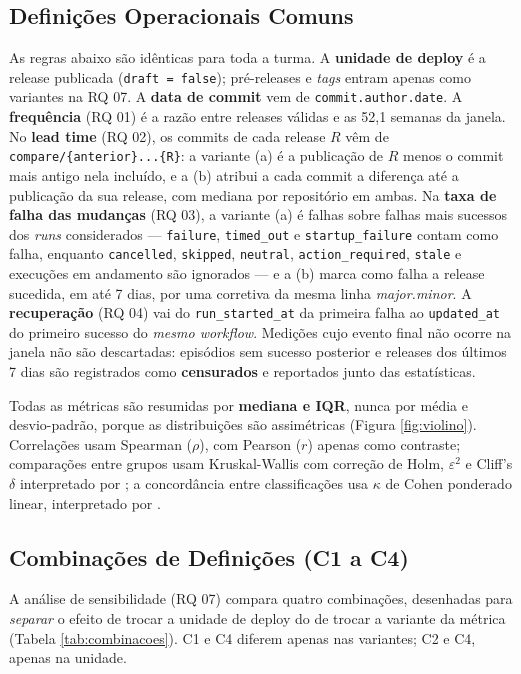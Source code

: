 \documentclass[12pt]{article}
\begin{document}
\subsection{Definições Operacionais Comuns}

As regras abaixo são idênticas para toda a turma. A \textbf{unidade de deploy} é a release
publicada (\texttt{draft = false}); pré-releases e \emph{tags} entram apenas como variantes na
RQ 07. A \textbf{data de commit} vem de \texttt{commit.author.date}. A \textbf{frequência}
(RQ 01) é a razão entre releases válidas e as 52,1 semanas da janela. No \textbf{lead time}
(RQ 02), os commits de cada release $R$ vêm de \texttt{compare/\{anterior\}...\{R\}}: a
variante (a) é a publicação de $R$ menos o commit mais antigo nela incluído, e a (b) atribui a
cada commit a diferença até a publicação da sua release, com mediana por repositório em ambas.
Na \textbf{taxa de falha das mudanças} (RQ 03), a variante (a) é falhas sobre falhas mais sucessos dos \emph{runs}
considerados --- \texttt{failure}, \texttt{timed\_out} e \texttt{startup\_failure} contam como
falha, enquanto \texttt{cancelled}, \texttt{skipped}, \texttt{neutral},
\texttt{action\_required}, \texttt{stale} e execuções em andamento são ignorados --- e a (b)
marca como falha a release sucedida, em até 7 dias, por uma corretiva da mesma linha
\emph{major.minor}. A \textbf{recuperação} (RQ 04) vai do \texttt{run\_started\_at} da
primeira falha ao \texttt{updated\_at} do primeiro sucesso do \emph{mesmo workflow}. Medições
cujo evento final não ocorre na janela não são descartadas: episódios sem sucesso posterior e
releases dos últimos 7 dias são registrados como \textbf{censurados} e reportados junto das
estatísticas.

Todas as métricas são resumidas por \textbf{mediana e IQR}, nunca por média e
desvio-padrão, porque as distribuições são assimétricas (Figura \ref{fig:violino}).
Correlações usam Spearman ($\rho$), com Pearson ($r$) apenas como contraste; comparações
entre grupos usam Kruskal-Wallis com correção de Holm, $\varepsilon^2$ e Cliff's $\delta$
interpretado por ; a concordância entre classificações usa $\kappa$
de Cohen ponderado linear, interpretado por .

\subsection{Combinações de Definições (C1 a C4)}

A análise de sensibilidade (RQ 07) compara quatro combinações, desenhadas para
\emph{separar} o efeito de trocar a unidade de deploy do de trocar a variante da métrica
(Tabela \ref{tab:combinacoes}). C1 e C4 diferem apenas nas variantes; C2 e C4, apenas na
unidade.
\end{document}

